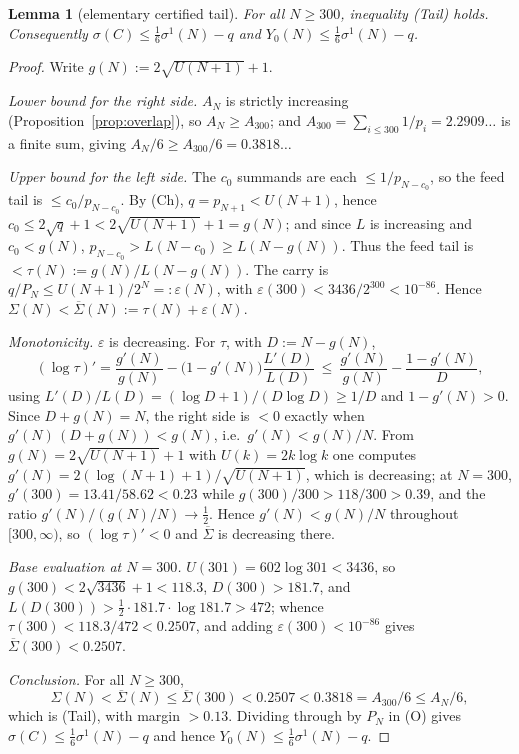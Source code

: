 \documentclass[10pt,a4paper]{amsart}
\newtheorem{lemma}{Lemma}
\begin{document}
\begin{lemma}[elementary certified tail]\label{lem:tail-elem}
For all $N\ge 300$, inequality \textup{(Tail)} holds.  Consequently
$\sigma(C)\le\tfrac16\sigma^1(N)-q$ and $Y_0(N)\le\tfrac16\sigma^1(N)-q$.
\end{lemma}

\begin{proof}
Write $g(N):=2\sqrt{U(N+1)}+1$.

\emph{Lower bound for the right side.}  $A_N$ is strictly increasing
(Proposition~\ref{prop:overlap}), so $A_N\ge A_{300}$; and
$A_{300}=\sum_{i\le 300}1/p_i=2.2909\ldots$ is a finite sum, giving
$A_N/6\ge A_{300}/6=0.3818\ldots$

\emph{Upper bound for the left side.}  The $c_0$ summands are each $\le1/p_{N-c_0}$,
so the feed tail is $\le c_0/p_{N-c_0}$.  By (Ch), $q=p_{N+1}<U(N+1)$, hence
$c_0\le 2\sqrt q+1<2\sqrt{U(N+1)}+1=g(N)$; and since $L$ is increasing and
$c_0<g(N)$, $p_{N-c_0}>L(N-c_0)\ge L(N-g(N))$.  Thus the feed tail is
$<\tau(N):=g(N)/L(N-g(N))$.  The carry is $q/P_N\le U(N+1)/2^N=:\varepsilon(N)$,
with $\varepsilon(300)<3436/2^{300}<10^{-86}$.  Hence
$\Sigma(N)<\overline\Sigma(N):=\tau(N)+\varepsilon(N)$.

\emph{Monotonicity.}  $\varepsilon$ is decreasing.  For $\tau$, with $D:=N-g(N)$,
\[
  (\log\tau)'=\frac{g'(N)}{g(N)}-\bigl(1-g'(N)\bigr)\frac{L'(D)}{L(D)}
  \ \le\ \frac{g'(N)}{g(N)}-\frac{1-g'(N)}{D},
\]
using $L'(D)/L(D)=(\log D+1)/(D\log D)\ge 1/D$ and $1-g'(N)>0$.  Since $D+g(N)=N$,
the right side is $<0$ exactly when $g'(N)\,(D+g(N))<g(N)$, i.e.\ $g'(N)<g(N)/N$.
From $g(N)=2\sqrt{U(N+1)}+1$ with $U(k)=2k\log k$ one computes
$g'(N)=2(\log(N+1)+1)/\sqrt{U(N+1)}$, which is decreasing; at $N=300$,
$g'(300)=13.41/58.62<0.23$ while $g(300)/300>118/300>0.39$, and the ratio
$g'(N)/(g(N)/N)\to\tfrac12$.  Hence $g'(N)<g(N)/N$ throughout $[300,\infty)$, so
$(\log\tau)'<0$ and $\overline\Sigma$ is decreasing there.

\emph{Base evaluation at $N=300$.}  $U(301)=602\log 301<3436$, so
$g(300)<2\sqrt{3436}+1<118.3$, $D(300)>181.7$, and
$L(D(300))>\tfrac12\cdot181.7\cdot\log 181.7>472$; whence
$\tau(300)<118.3/472<0.2507$, and adding $\varepsilon(300)<10^{-86}$ gives
$\overline\Sigma(300)<0.2507$.

\emph{Conclusion.}  For all $N\ge300$,
\[
  \Sigma(N)<\overline\Sigma(N)\le\overline\Sigma(300)<0.2507<0.3818
  =A_{300}/6\le A_N/6,
\]
which is (Tail), with margin $>0.13$.  Dividing through by $P_N$ in (O) gives
$\sigma(C)\le\tfrac16\sigma^1(N)-q$ and hence $Y_0(N)\le\tfrac16\sigma^1(N)-q$.
\end{proof}
\end{document}
